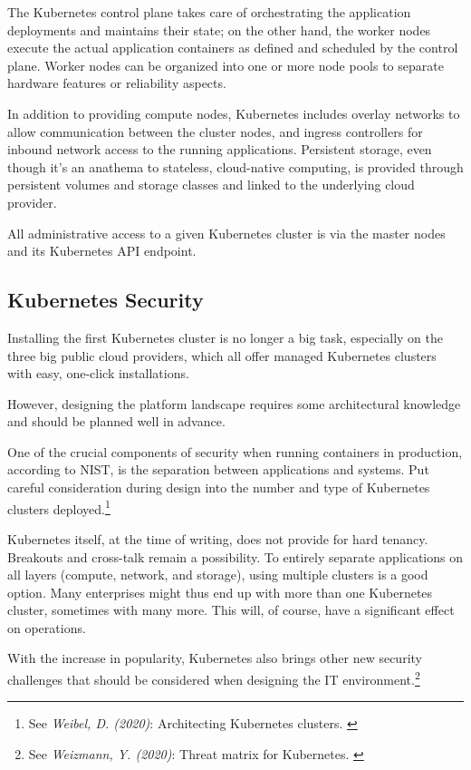 The Kubernetes control plane takes care of orchestrating the application deployments and maintains their state; on the other hand, the worker nodes execute the actual application containers as defined and scheduled by the control plane. Worker nodes can be organized into one or more node pools to separate hardware features or reliability aspects.

In addition to providing compute nodes, Kubernetes includes overlay networks to allow communication between the cluster nodes, and ingress controllers for inbound network access to the running applications. Persistent storage, even though it's an anathema to stateless, cloud-native computing, is provided through persistent volumes and storage classes and linked to the underlying cloud provider.

All administrative access to a given Kubernetes cluster is via the master nodes and its Kubernetes API endpoint.

\subsection{Kubernetes Security}

Installing the first Kubernetes cluster is no longer a big task, especially on the three big public cloud providers, which all offer managed Kubernetes clusters with easy, one-click installations.

However, designing the platform landscape requires some architectural knowledge and should be planned well in advance.

One of the crucial components of security when running containers in production, according to NIST, is the separation between applications and systems. Put careful consideration during design into the number and type of Kubernetes clusters deployed.\footnote{See \textit{Weibel, D. (2020)}: Architecting Kubernetes clusters. \cite{howMany}}

Kubernetes itself, at the time of writing, does not provide for hard tenancy. Breakouts and cross-talk remain a possibility. To entirely separate applications on all layers (compute, network, and storage), using multiple clusters is a good option. Many enterprises might thus end up with more than one Kubernetes cluster, sometimes with many more. This will, of course, have a significant effect on operations.

With the increase in popularity, Kubernetes also brings other new security challenges that should be considered when designing the IT environment.\footnote{See \textit{Weizmann, Y. (2020)}: Threat matrix for Kubernetes. \cite{threatMatrix}}

